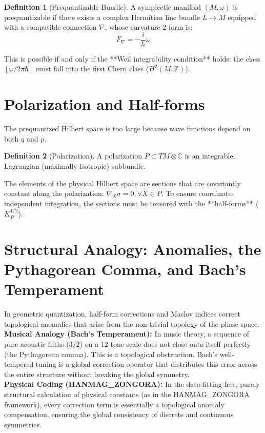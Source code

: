 \documentclass[11pt,a4paper,oneside]{book}
\theoremstyle{definition}
\newtheorem{definition}{Definition}[chapter]
\theoremstyle{plain}
\newcommand{\C}{\mathbb{C}}
\newcommand{\Z}{\mathbb{Z}}
\begin{document}
\begin{definition}[Prequantizable Bundle]
A symplectic manifold $(M, \omega)$ is prequantizable if there exists a complex Hermitian line bundle $L \to M$ equipped with a compatible connection $\nabla$, whose curvature 2-form is:
\begin{equation}
F_\nabla = -\frac{i}{\hbar} \omega
\end{equation}
\end{definition}

This is possible if and only if the **Weil integrability condition** holds: the class $[\omega / 2\pi\hbar]$ must fall into the first Chern class ($H^2(M, \Z)$).

\section{Polarization and Half-forms}
The prequantized Hilbert space is too large because wave functions depend on both $q$ and $p$.

\begin{definition}[Polarization]
A polarization $P \subset TM \otimes \C$ is an integrable, Lagrangian (maximally isotropic) subbundle.
\end{definition}

The elements of the physical Hilbert space are sections that are covariantly constant along the polarization: $\nabla_X \sigma = 0, \forall X \in P$. To ensure coordinate-independent integration, the sections must be tensored with the **half-forms** ($K_P^{1/2}$).

\section{Structural Analogy: Anomalies, the Pythagorean Comma, and Bach's Temperament}

\begin{insightbox}
In geometric quantization, half-form corrections and Maslov indices correct topological anomalies that arise from the non-trivial topology of the phase space.\\[0.5em]
\textbf{Musical Analogy (Bach's Temperament):} In music theory, a sequence of pure acoustic fifths ($3/2$) on a 12-tone scale does not close onto itself perfectly (the Pythagorean comma). This is a topological obstruction. Bach's well-tempered tuning is a global correction operator that distributes this error across the entire structure without breaking the global symmetry.\\[0.5em]
\textbf{Physical Coding (HANMAG\_ZONGORA):} In the data-fitting-free, purely structural calculation of physical constants (as in the HANMAG\_ZONGORA framework), every correction term is essentially a topological anomaly compensation, ensuring the global consistency of discrete and continuous symmetries.
\end{insightbox}
\end{document}
